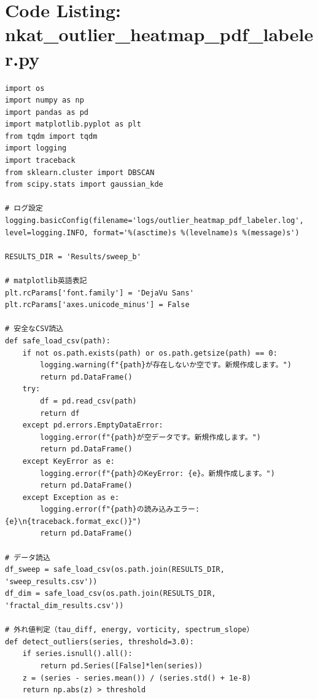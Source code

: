 \section*{Code Listing: nkat_outlier_heatmap_pdf_labeler.py}
\begin{verbatim}
import os
import numpy as np
import pandas as pd
import matplotlib.pyplot as plt
from tqdm import tqdm
import logging
import traceback
from sklearn.cluster import DBSCAN
from scipy.stats import gaussian_kde

# ログ設定
logging.basicConfig(filename='logs/outlier_heatmap_pdf_labeler.log', level=logging.INFO, format='%(asctime)s %(levelname)s %(message)s')

RESULTS_DIR = 'Results/sweep_b'

# matplotlib英語表記
plt.rcParams['font.family'] = 'DejaVu Sans'
plt.rcParams['axes.unicode_minus'] = False

# 安全なCSV読込
def safe_load_csv(path):
    if not os.path.exists(path) or os.path.getsize(path) == 0:
        logging.warning(f"{path}が存在しないか空です。新規作成します。")
        return pd.DataFrame()
    try:
        df = pd.read_csv(path)
        return df
    except pd.errors.EmptyDataError:
        logging.error(f"{path}が空データです。新規作成します。")
        return pd.DataFrame()
    except KeyError as e:
        logging.error(f"{path}のKeyError: {e}。新規作成します。")
        return pd.DataFrame()
    except Exception as e:
        logging.error(f"{path}の読み込みエラー: {e}\n{traceback.format_exc()}")
        return pd.DataFrame()

# データ読込
df_sweep = safe_load_csv(os.path.join(RESULTS_DIR, 'sweep_results.csv'))
df_dim = safe_load_csv(os.path.join(RESULTS_DIR, 'fractal_dim_results.csv'))

# 外れ値判定（tau_diff, energy, vorticity, spectrum_slope）
def detect_outliers(series, threshold=3.0):
    if series.isnull().all():
        return pd.Series([False]*len(series))
    z = (series - series.mean()) / (series.std() + 1e-8)
    return np.abs(z) > threshold


\end{verbatim}

